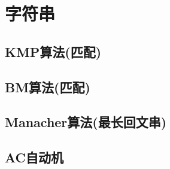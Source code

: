 
\chapter{字符串}
\section{KMP算法(匹配)}

\section{BM算法(匹配)}

\section{Manacher算法(最长回文串)}

\section{AC自动机}
